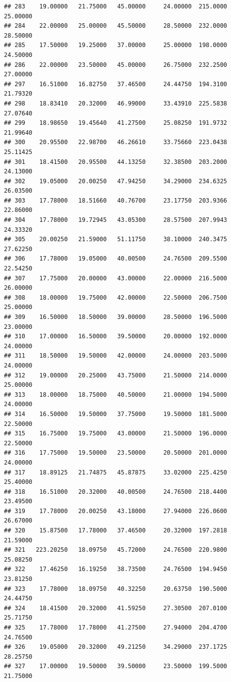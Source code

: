 \documentclass[]{article}
\begin{document}
\begin{verbatim}
## 283    19.00000   21.75000   45.00000     24.00000  215.0000    25.00000
## 284    22.00000   25.00000   45.50000     28.50000  232.0000    28.50000
## 285    17.50000   19.25000   37.00000     25.00000  198.0000    24.50000
## 286    22.00000   23.50000   45.00000     26.75000  232.2500    27.00000
## 297    16.51000   16.82750   37.46500     24.44750  194.3100    21.79320
## 298    18.83410   20.32000   46.99000     33.43910  225.5838    27.07640
## 299    18.98650   19.45640   41.27500     25.08250  191.9732    21.99640
## 300    20.95500   22.98700   46.26610     33.75660  223.0438    25.11425
## 301    18.41500   20.95500   44.13250     32.38500  203.2000    24.13000
## 302    19.05000   20.00250   47.94250     34.29000  234.6325    26.03500
## 303    17.78000   18.51660   40.76700     23.17750  203.9366    22.86000
## 304    17.78000   19.72945   43.05300     28.57500  207.9943    24.33320
## 305    20.00250   21.59000   51.11750     38.10000  240.3475    27.62250
## 306    17.78000   19.05000   40.00500     24.76500  209.5500    22.54250
## 307    17.75000   20.00000   43.00000     22.00000  216.5000    26.00000
## 308    18.00000   19.75000   42.00000     22.50000  206.7500    25.00000
## 309    16.50000   18.50000   39.00000     28.50000  196.5000    23.00000
## 310    17.00000   16.50000   39.50000     20.00000  192.0000    24.00000
## 311    18.50000   19.50000   42.00000     24.00000  203.5000    24.00000
## 312    19.00000   20.25000   43.75000     21.50000  214.0000    25.00000
## 313    18.00000   18.75000   40.50000     21.00000  194.5000    24.00000
## 314    16.50000   19.50000   37.75000     19.50000  181.5000    22.50000
## 315    16.75000   19.75000   43.00000     21.50000  196.0000    22.50000
## 316    17.75000   19.50000   23.50000     20.50000  201.0000    24.00000
## 317    18.89125   21.74875   45.87875     33.02000  225.4250    25.40000
## 318    16.51000   20.32000   40.00500     24.76500  218.4400    23.49500
## 319    17.78000   20.00250   43.18000     27.94000  226.0600    26.67000
## 320    15.87500   17.78000   37.46500     20.32000  197.2818    21.59000
## 321   223.20250   18.09750   45.72000     24.76500  220.9800    25.08250
## 322    17.46250   16.19250   38.73500     24.76500  194.9450    23.81250
## 323    17.78000   18.09750   40.32250     20.63750  190.5000    24.44750
## 324    18.41500   20.32000   41.59250     27.30500  207.0100    25.71750
## 325    17.78000   17.78000   41.27500     27.94000  204.4700    24.76500
## 326    19.05000   20.32000   49.21250     34.29000  237.1725    28.25750
## 327    17.00000   19.50000   39.50000     23.50000  199.5000    21.75000

\end{verbatim}
\end{document}
